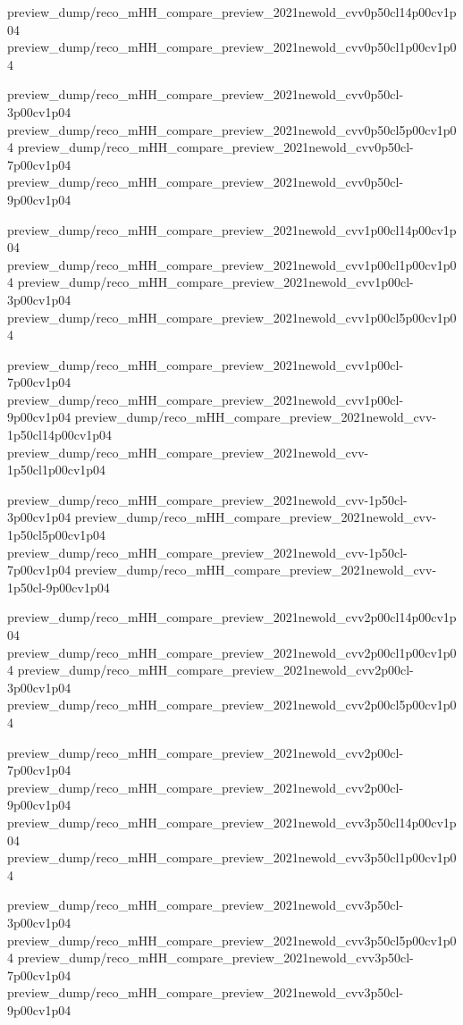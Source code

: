 


{preview_dump/reco_mHH_compare_preview_2021newold_cvv0p50cl14p00cv1p04}
{preview_dump/reco_mHH_compare_preview_2021newold_cvv0p50cl1p00cv1p04}

{preview_dump/reco_mHH_compare_preview_2021newold_cvv0p50cl-3p00cv1p04}
{preview_dump/reco_mHH_compare_preview_2021newold_cvv0p50cl5p00cv1p04}
{preview_dump/reco_mHH_compare_preview_2021newold_cvv0p50cl-7p00cv1p04}
{preview_dump/reco_mHH_compare_preview_2021newold_cvv0p50cl-9p00cv1p04}

{preview_dump/reco_mHH_compare_preview_2021newold_cvv1p00cl14p00cv1p04}
{preview_dump/reco_mHH_compare_preview_2021newold_cvv1p00cl1p00cv1p04}
{preview_dump/reco_mHH_compare_preview_2021newold_cvv1p00cl-3p00cv1p04}
{preview_dump/reco_mHH_compare_preview_2021newold_cvv1p00cl5p00cv1p04}

{preview_dump/reco_mHH_compare_preview_2021newold_cvv1p00cl-7p00cv1p04}
{preview_dump/reco_mHH_compare_preview_2021newold_cvv1p00cl-9p00cv1p04}
{preview_dump/reco_mHH_compare_preview_2021newold_cvv-1p50cl14p00cv1p04}
{preview_dump/reco_mHH_compare_preview_2021newold_cvv-1p50cl1p00cv1p04}

{preview_dump/reco_mHH_compare_preview_2021newold_cvv-1p50cl-3p00cv1p04}
{preview_dump/reco_mHH_compare_preview_2021newold_cvv-1p50cl5p00cv1p04}
{preview_dump/reco_mHH_compare_preview_2021newold_cvv-1p50cl-7p00cv1p04}
{preview_dump/reco_mHH_compare_preview_2021newold_cvv-1p50cl-9p00cv1p04}

{preview_dump/reco_mHH_compare_preview_2021newold_cvv2p00cl14p00cv1p04}
{preview_dump/reco_mHH_compare_preview_2021newold_cvv2p00cl1p00cv1p04}
{preview_dump/reco_mHH_compare_preview_2021newold_cvv2p00cl-3p00cv1p04}
{preview_dump/reco_mHH_compare_preview_2021newold_cvv2p00cl5p00cv1p04}

{preview_dump/reco_mHH_compare_preview_2021newold_cvv2p00cl-7p00cv1p04}
{preview_dump/reco_mHH_compare_preview_2021newold_cvv2p00cl-9p00cv1p04}
{preview_dump/reco_mHH_compare_preview_2021newold_cvv3p50cl14p00cv1p04}
{preview_dump/reco_mHH_compare_preview_2021newold_cvv3p50cl1p00cv1p04}

{preview_dump/reco_mHH_compare_preview_2021newold_cvv3p50cl-3p00cv1p04}
{preview_dump/reco_mHH_compare_preview_2021newold_cvv3p50cl5p00cv1p04}
{preview_dump/reco_mHH_compare_preview_2021newold_cvv3p50cl-7p00cv1p04}
{preview_dump/reco_mHH_compare_preview_2021newold_cvv3p50cl-9p00cv1p04}

